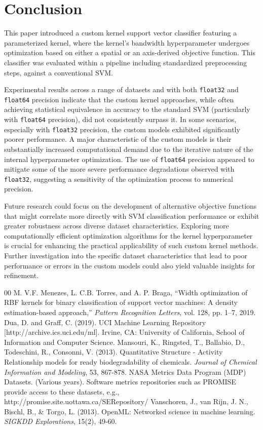 \documentclass[conference]{IEEEtran}
\begin{document}
\section{Conclusion}
This paper introduced a custom kernel support vector classifier featuring a parameterized kernel, where the kernel's bandwidth hyperparameter undergoes optimization based on either a spatial or an axis-derived objective function. This classifier was evaluated within a pipeline including standardized preprocessing steps, against a conventional SVM.

Experimental results across a range of datasets and with both \texttt{float32} and \texttt{float64} precision indicate that the custom kernel approaches, while often achieving statistical equivalence in accuracy to the standard SVM (particularly with \texttt{float64} precision), did not consistently surpass it. In some scenarios, especially with \texttt{float32} precision, the custom models exhibited significantly poorer performance. A major characteristic of the custom models is their substantially increased computational demand due to the iterative nature of the internal hyperparameter optimization. The use of \texttt{float64} precision appeared to mitigate some of the more severe performance degradations observed with \texttt{float32}, suggesting a sensitivity of the optimization process to numerical precision.

Future research could focus on the development of alternative objective functions that might correlate more directly with SVM classification performance or exhibit greater robustness across diverse dataset characteristics. Exploring more computationally efficient optimization algorithms for the kernel hyperparameter is crucial for enhancing the practical applicability of such custom kernel methods. Further investigation into the specific dataset characteristics that lead to poor performance or errors in the custom models could also yield valuable insights for refinement.

\begin{thebibliography}{00}
M. V.F. Menezes, L. C.B. Torres, and A. P. Braga, ``Width optimization of RBF kernels for binary classification of support vector machines: A density estimation-based approach,'' \textit{Pattern Recognition Letters}, vol. 128, pp. 1--7, 2019.
Dua, D. and Graff, C. (2019). UCI Machine Learning Repository [http://archive.ics.uci.edu/ml]. Irvine, CA: University of California, School of Information and Computer Science.
Mansouri, K., Ringsted, T., Ballabio, D., Todeschini, R., Consonni, V. (2013). Quantitative Structure - Activity Relationship models for ready biodegradability of chemicals. \textit{Journal of Chemical Information and Modeling}, 53, 867-878.
NASA Metrics Data Program (MDP) Datasets. (Various years). Software metrics repositories such as PROMISE provide access to these datasets, e.g., http://promise.site.uottawa.ca/SERepository/
Vanschoren, J., van Rijn, J. N., Bischl, B., \& Torgo, L. (2013). OpenML: Networked science in machine learning. \textit{SIGKDD Explorations}, 15(2), 49-60.

\end{thebibliography}
\end{document}
